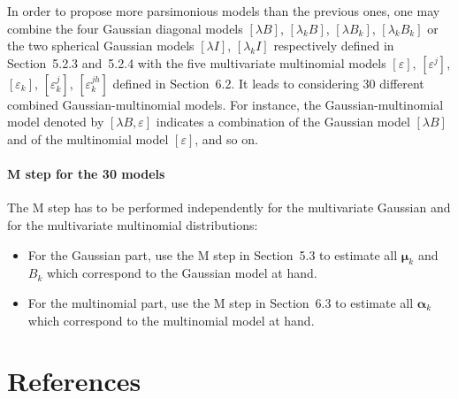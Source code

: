 \documentclass[12pt]{article}
\newcommand{\balpha}{\boldsymbol{\alpha}}
\newcommand{\bmu}{\boldsymbol{\mu}}
\begin{document}
In order to propose more parsimonious models than the previous ones, one may combine the four Gaussian diagonal models $[\lambda B]$, $[\lambda_k B]$, $[\lambda B_k]$, $[\lambda_k B_k]$ or the two spherical Gaussian models $[\lambda I]$, $[\lambda_k I]$ respectively defined in Section~5.2.3 and~5.2.4 with the five multivariate multinomial models $[\varepsilon]$, $[\varepsilon^j]$, $[\varepsilon_k]$, $[\varepsilon_k^j]$, $[\varepsilon_k^{jh}]$ defined in Section~6.2. It leads to considering 30 different combined Gaussian-multinomial models. For instance, the Gaussian-multinomial model denoted by $[\lambda B,\varepsilon]$ indicates a combination of the Gaussian model $[\lambda B]$ and of the multinomial model $[\varepsilon]$, and so on.

\subsection{M step for the 30 models}

The M step has to be performed independently for the multivariate Gaussian and for the multivariate multinomial distributions:
\begin{itemize}
\item For the Gaussian part, use the M step in Section~5.3 to estimate all $\bmu_k$ and $B_k$ which correspond to the Gaussian model at hand.
\item For the multinomial part, use the M step in Section~6.3 to estimate all $\balpha_k$ which correspond to the multinomial model at hand.
\end{itemize}

\newpage
\part*{References}

\end{document}
